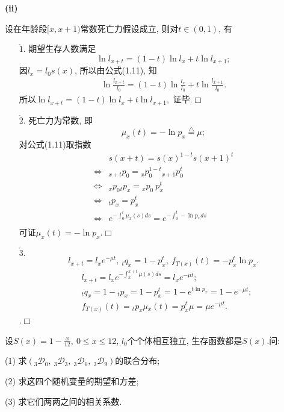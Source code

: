 \documentclass[a4paper,10pt]{ctexbook}
\def\qed{\hfill$\Box$\medskip}
\begin{document}
{\rm\bf(ii)}  \begin{proposition}设在年龄段$[x,x+1)$常数死亡力假设成立, 则对$t\in (0,1)$, 有
    \begin{enumerate}
        \item[$\mathring 1.$] 期望生存人数满足
            $$\ln l_{x+t}=(1-t)\ln l_{x}+t\ln l_{x+1};$$
            \proof 因$l_{x}=l_{0}s(x)$, 所以由公式(1.11), 知\begin{align*}
                \ln \frac{l_{x+t}}{l_{0}}=(1-t)\ln \frac{l_{x}}{l_{0}}+t\ln \frac{l_{x+1}}{l_{0}}.
            \end{align*}所以$\ln l_{x+t}=(1-t)\ln l_{x}+t\ln l_{x+1},$
            证毕.\qed
        \item[$\mathring 2.$] 死亡力为常数, 即
            $$\mu _{x}(t)=-\ln p_{x}\stackrel{\triangle}{=}\mu;$$
            \proof 对公式(1.11)取指数
            \begin{align*}
                                    & s(x+t)  =s(x)^{1-t}s(x+1)^{t}                              \\
                \Longleftrightarrow & {}_{x+t}p_{0} = {}_xp_{0}^{1-t}{}_{x+1}p_{0}^t             \\
                \Longleftrightarrow & {}_{x}p_{0}{}_{t}p_x = {}_xp_{0}~p_{x}^{t}                 \\
                \Longleftrightarrow & {}_{t}p_x = p_x^t                                          \\
                \Longleftrightarrow & e^{-\int_{0}^{t}\mu_x(s)ds} = e^{-\int_{0}^{t}-\ln p_x ds} \\
            \end{align*}
            可证$\mu _{x}(t)=-\ln p_{x}$.\qed
        \item[$\mathring 3.$] $$l_{x+t}=l_{x}e^{-\mu t},\ _{t}q_{x}=1-p^{t}_{x},\ f_{T(x)}(t)=-p_{x}^{t}\ln p_{x}.$$
            \proof \begin{align*}
                 & l_{x+t}=l_{x}e^{-\int_{x}^{x+t}\mu (s)ds}=l_{x}e^{-\mu t};         \\
                 & _{t}q_{x}=1-{}_{t}p_{x}=1-p_{x}^{t}=1-e^{t\ln p_{x}}=1-e^{-\mu t}; \\
                 & f_{T(x)}(t)={}_{t}p_{x}\mu {}_{x}(t)=p_{x}^{t}\mu=\mu e^{-\mu t}.
            \end{align*}.\qed
    \end{enumerate}
\end{proposition}

\begin{example}
    设$S(x)=1-\frac{x}{12},\ 0\leq x\leq 12$, $l_{0}$个个体相互独立, 生存函数都是$S(x)$.问:

    (1) 求$(_{3}\mathscr D _{0},\ _{3}\mathscr D_{3},\ _{3}\mathscr D _{6},\ _{3}\mathscr D _{9})$的联合分布;

    (2) 求这四个随机变量的期望和方差;

    (3) 求它们两两之间的相关系数.
\end{example}
\end{document}
